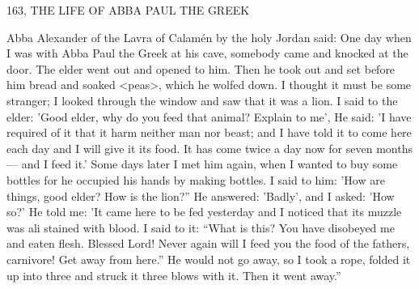 163, THE LIFE OF ABBA PAUL THE GREEK

Abba Alexander of the Lavra of Calamén by the holy Jordan said:
One day when I was with Abba Paul the Greek at his cave,
somebody came and knocked at the door.
The elder went out and
opened to him.
Then he took out and set before him bread and
soaked <peas>, which he wolfed down.
I thought it must be some
stranger; I looked through the window and saw that it was a lion.
I said to the elder: 'Good elder, why do you feed that animal?
Explain to me', He said: 'I have required of it that it harm neither
man nor beast; and I have told it to come here each day and I will
give it its food.
It has come twice a day now for seven months—
and I feed it.' Some days later I met him again, when I wanted to
buy some bottles for he occupied his hands by making bottles.
I
said to him: 'How are things, good elder? How is the lion?” He
answered: 'Badly', and I asked: 'How so?' He told me: 'It came here
to be fed yesterday and I noticed that its muzzle was ali stained with
blood.
I said to it: “What is this? You have disobeyed me and eaten
flesh.
Blessed Lord! Never again will I feed you the food of the
fathers, carnivore! Get away from here.” He would not go away, so
I took a rope, folded it up into three and struck it three blows with
it.
Then it went away.”

